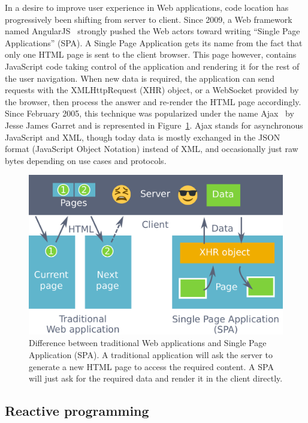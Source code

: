 In a desire to improve user experience in Web applications,
code location has progressively been shifting from server to client.
Since 2009, a Web framework named AngularJS~\cite{hevery2009declarative} strongly pushed
the Web actors toward writing ``Single Page Applications'' (SPA).
A Single Page Application gets its name from the fact that only one
HTML page is sent to the client browser.
This page however, contains JavaScript code taking control
of the application and rendering it for the rest of the user navigation.
When new data is required, the application can send requests
with the XMLHttpRequest (XHR) object, or a WebSocket provided by the browser,
then process the answer and re-render the HTML page accordingly.
Since February 2005, this technique was popularized under the name Ajax~\cite{ajax}
by Jesse James Garret and is represented in Figure~\ref{fig:spa}.
Ajax stands for asynchronous JavaScript and XML,
though today data is mostly exchanged in the JSON format (JavaScript Object Notation) instead of XML,
and occasionally just raw bytes depending on use cases and protocols.

\begin{figure}[ht]
	\centering
	\includegraphics[width=1.0\linewidth]{assets/img/spa-bis.pdf}
	\caption{Difference between traditional Web applications and Single Page Application (SPA). A traditional application will ask the server to generate a new HTML page to access the required content. A SPA will just ask for the required data and render it in the client directly.}%
	\label{fig:spa}
\end{figure}


\subsection{Reactive programming}%
\label{sub:functional_reactive_programming}

